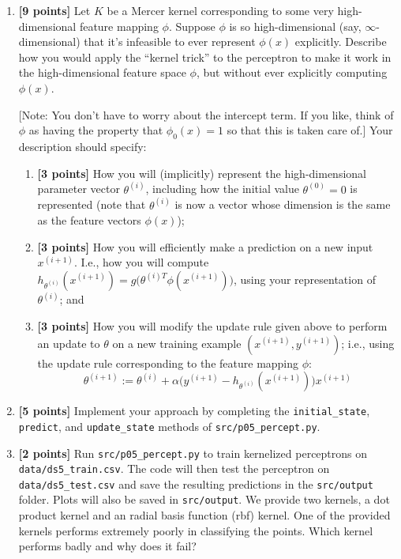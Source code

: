 \documentclass[11pt]{article}
\newcommand{\code}[1]{\nolinkurl{#1}}
\begin{document}
\begin{enumerate}
\item \textbf{[9 points]} Let $K$ be a Mercer kernel corresponding to some very high-dimensional feature mapping $\phi$. Suppose $\phi$ is so high-dimensional (say, $\infty$-dimensional) that it's infeasible to ever represent $\phi(x)$ explicitly. Describe how you would apply the ``kernel trick'' to the perceptron to make it work in the high-dimensional feature space $\phi$, but without ever explicitly computing $\phi(x)$.

[Note: You don't have to worry about the intercept term. If you like, think of $\phi$ as having the property that $\phi_0(x)=1$ so that this is taken care of.] Your description should specify:
\begin{enumerate}
\item \textbf{[3 points]} How you will (implicitly) represent the high-dimensional parameter vector $\theta^{(i)}$, including how the initial value $\theta^{(0)}=0$ is represented (note that $\theta^{(i)}$ is now a vector whose dimension is the same as the feature vectors $\phi(x)$);
\item \textbf{[3 points]} How you will efficiently make a prediction on a new input $x^{(i+1)}$. I.e., how you will compute $h_{\theta^{(i)}}(x^{(i+1)})=g\bigl(\theta^{(i)T}\phi(x^{(i+1)})\bigr)$, using your representation of $\theta^{(i)}$; and
\item \textbf{[3 points]} How you will modify the update rule given above to perform an update to $\theta$ on a new training example $(x^{(i+1)},y^{(i+1)})$; i.e., using the update rule corresponding to the feature mapping $\phi$:
\[\theta^{(i+1)}:=\theta^{(i)}+\alpha\bigl(y^{(i+1)}-h_{\theta^{(i)}}(x^{(i+1)})\bigr)x^{(i+1)}\]
\end{enumerate}
\item \textbf{[5 points]} Implement your approach by completing the \code{initial_state}, \code{predict}, and \code{update_state} methods of \code{src/p05_percept.py}.
\item \textbf{[2 points]} Run \code{src/p05_percept.py} to train kernelized perceptrons on \code{data/ds5_train.csv}. The code will then test the perceptron on \code{data/ds5_test.csv} and save the resulting predictions in the \code{src/output} folder. Plots will also be saved in \code{src/output}. We provide two kernels, a dot product kernel and an radial basis function (rbf) kernel. One of the provided kernels performs extremely poorly in classifying the points. Which kernel performs badly and why does it fail?
\end{enumerate}
\end{document}
